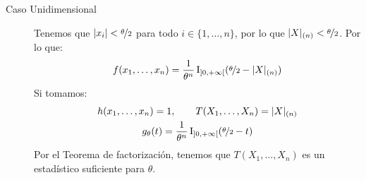 \begin{ejercicio}
\begin{enumerate}[label=\alph*)]
\begin{description}
                \item[Caso Unidimensional]
                Tenemos que $|x_i|<\nicefrac{\theta}{2}$ para todo $i\in \{1,\ldots,n\}$, por lo que $|X|_{(n)}<\nicefrac{\theta}{2}$. Por lo que:
                \begin{equation*}
                    f(x_1, \ldots, x_n) = \dfrac{1}{\theta^n} \operatorname{I}_{\left]0,+\infty\right[}(\nicefrac{\theta}{2}-|X|_{(n)})
                \end{equation*}
                Si tomamos:
                \begin{gather*}
                    h(x_1,\ldots,x_n)=1,\qquad T(X_1, \ldots, X_n) = |X|_{(n)} \\ g_{\theta}(t) = \dfrac{1}{\theta^n} \operatorname{I}_{\left]0,+\infty\right[}(\nicefrac{\theta}{2}-t)
                \end{gather*}
                Por el Teorema de factorización, tenemos que $T(X_1, \ldots, X_n)$ es un estadístico suficiente para $\theta$.
            \end{description}


\end{enumerate}
\end{ejercicio}
